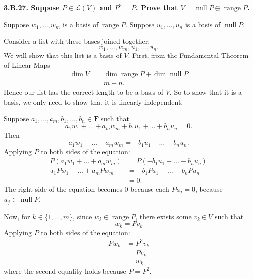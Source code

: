 \documentclass[a5paper]{article}
\begin{document}
\newcommand   \C           {\mathbf{C}}
\newcommand   \R           {\mathbf{R}}
\renewcommand \L           {\mathcal{L}}
\newcommand   \F           {\mathbf{F}}
\renewcommand \P           {\mathcal{P}}
\newcommand   \M           {\mathcal{M}}
\newcommand   \question[1] {\textbf{\boldmath#1\unboldmath}\par}
\newcommand   \op          {\operatorname}

\question{
    3.B.27.
    Suppose $P \in \L(V)$ and $P^2 = P$.
    Prove that $V = \op{null}P \oplus \op{range}P$.
}

    Suppose $w_1,\dots,w_m$ is a basis of $\op{range}P$.
    Suppose $u_1,\dots,u_n$ is a basis of $\op{null}P$.

    Consider a list with these bases joined together:
\begin{equation*}
        w_1,\dots,w_m, u_1,\dots,u_n .
\end{equation*}
    We will show that this list is a basis of $V$.
    First, from the Fundamental Theorem of Linear Maps,
\begin{align*}
        \op{dim}V &= \op{dim}\op{range}P + \op{dim}\op{null}P \\
                  &= m + n .
\end{align*}
    Hence our list has the correct length to be a basis of $V$.
    So to show that it is a basis, we only need to show that it is linearly independent.

    Suppose $a_1,\dots,a_m,b_1,\dots,b_n \in \F$ such that
\begin{equation*}
        a_1w_1 + \dots + a_mw_m + b_1u_1 + \dots + b_nu_n = 0 .
\end{equation*}
    Then
\begin{equation*}
        a_1w_1 + \dots + a_mw_m = -b_1u_1 - \dots - b_nu_n .
\end{equation*}
    Applying $P$ to both sides of the equation:
\begin{align*}
        P(a_1w_1 + \dots + a_mw_m) &= P(-b_1u_1 - \dots - b_nu_n) \\
         a_1Pw_1 + \dots + a_mPw_m &= -b_1Pu_1 - \dots - b_nPu_n  \\
                                   &= 0 .
\end{align*}
    The right side of the equation becomes 0 because each $Pu_j = 0$, because $u_j \in \op{null}P$.

    Now, for $k \in \{ 1,\dots,m \}$, since $w_k \in \op{range}P$, there exists some $v_k \in V$ such that
\begin{equation*}
        w_k = Pv_k
\end{equation*}
    Applying $P$ to both sides of the equation:
\begin{align*}
        Pw_k &= P^2v_k \\
             &= Pv_k \\
             &= w_k
\end{align*}
    where the second equality holds because $P = P^2$.
\end{document}
